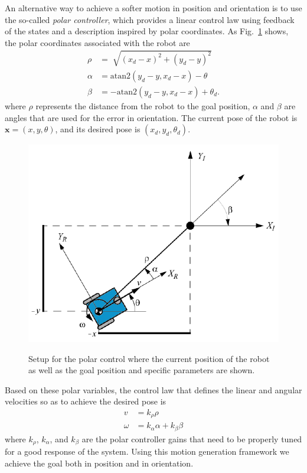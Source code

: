 \documentclass[conference]{IEEEtran}
\newcommand{\x}{\mathbf x}
\begin{document}
An alternative way to achieve a softer motion in position and orientation is to
use the so-called \textit{polar controller}, which provides a linear control
law using feedback of the states and a description inspired by polar
coordinates. As Fig.~\ref{fig:Polar} shows, the polar coordinates associated
with the robot are
\begin{align*}
  \rho &= \sqrt[]{(x_{d} - x)^2 + (y_{d} - y)^2}  \\
  \alpha &= \text{atan2}(y_{d} - y, x_{d} - x) - \theta  \\
  \beta &= -\text{atan2}(y_{d} - y, x_{d} - x) + \theta_{d}.
\end{align*}
where $\rho$ represents the distance from the robot to the goal position,
$\alpha$ and $\beta$ are angles that are used for the error in orientation. The
current pose of the robot is $\x=(x,y,\theta)$, and its desired pose is
$(x_d,y_d,\theta_d)$. 
\begin{figure}%
 \centering \footnotesize
  \subfloat
  {\includegraphics[width=0.7\linewidth]{images/control_polar.png}}
  \captionsetup{font=footnotesize}
 \caption{Setup for the polar control where the current position of the robot
   as well as the goal position and specific parameters are shown.}
 \label{fig:Polar}
\end{figure}
Based on these polar variables, the control law that defines the linear and
angular velocities so as to achieve the desired pose is
\begin{align}
  \label{eq:v}
  v &= k_{\rho}\rho \\
  \label{eq:w}
  \omega &= k_{\alpha}\alpha + k_{\beta}\beta
\end{align}
where $k_{\rho}$, $k_{\alpha}$, and $k_{\beta}$ are the polar controller gains
that need to be properly tuned for a good response of the system. Using this
motion generation framework we achieve the goal both in position and in
orientation.
\end{document}
